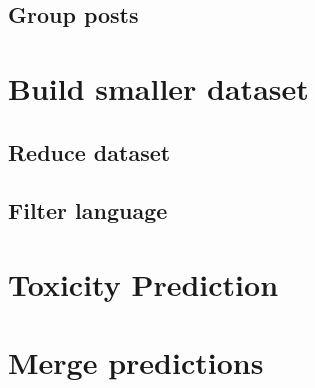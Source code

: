 \subsection{Group posts}

\section{Build smaller dataset}
\subsection{Reduce dataset}
\subsection{Filter language}

\section{Toxicity Prediction}

\section{Merge predictions}